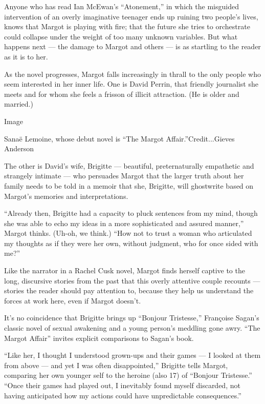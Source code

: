 Anyone who has read Ian McEwan's ``Atonement,'' in which the misguided
intervention of an overly imaginative teenager ends up ruining two
people's lives, knows that Margot is playing with fire; that the future
she tries to orchestrate could collapse under the weight of too many
unknown variables. But what happens next --- the damage to Margot and
others --- is as startling to the reader as it is to her.

As the novel progresses, Margot falls increasingly in thrall to the only
people who seem interested in her inner life. One is David Perrin, that
friendly journalist she meets and for whom she feels a frisson of
illicit attraction. (He is older and married.)

Image

Sanaë Lemoine, whose debut novel is ``The Margot
Affair.''Credit...Gieves Anderson

The other is David's wife, Brigitte --- beautiful, preternaturally
empathetic and strangely intimate --- who persuades Margot that the
larger truth about her family needs to be told in a memoir that she,
Brigitte, will ghostwrite based on Margot's memories and
interpretations.

``Already then, Brigitte had a capacity to pluck sentences from my mind,
though she was able to echo my ideas in a more sophisticated and assured
manner,'' Margot thinks. (Uh-oh, we think.) ``How not to trust a woman
who articulated my thoughts as if they were her own, without judgment,
who for once sided with me?''

Like the narrator in a Rachel Cusk novel, Margot finds herself captive
to the long, discursive stories from the past that this overly attentive
couple recounts --- stories the reader should pay attention to, because
they help us understand the forces at work here, even if Margot doesn't.

It's no coincidence that Brigitte brings up ``Bonjour Tristesse,''
Françoise Sagan's classic novel of sexual awakening and a young person's
meddling gone awry. ``The Margot Affair'' invites explicit comparisons
to Sagan's book.

``Like her, I thought I understood grown-ups and their games --- I
looked at them from above --- and yet I was often disappointed,''
Brigitte tells Margot, comparing her own younger self to the heroine
(also 17) of ``Bonjour Tristesse.'' ``Once their games had played out, I
inevitably found myself discarded, not having anticipated how my actions
could have unpredictable consequences.''

